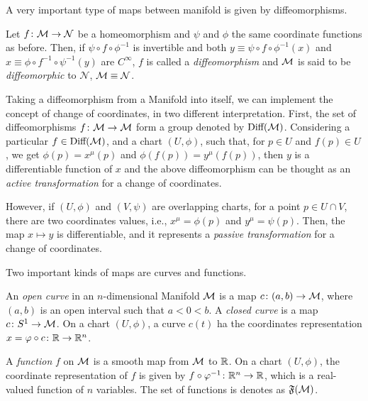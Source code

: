 A very important type of maps between manifold is given by diffeomorphisms.
\begin{definition}[Diffeomorphism]
    Let $f \colon \mathcal{M} \to \mathcal{N}$ be a homeomorphism and $\psi$ and $\phi$ the same coordinate functions as before. Then, if $\psi \circ f \circ \phi^{-1}$ is invertible and both $y \equiv \psi \circ f \circ \phi^{-1}(x)$ and $x \equiv \phi \circ f^{-1} \circ \psi^{-1}(y)$ are $C^\infty$, $f$ is called a \emph{diffeomorphism} and $\mathcal{M}$ is said to be \emph{diffeomorphic} to $\mathcal{N}$, $\mathcal{M} \equiv \mathcal{N}$.
\end{definition}

Taking a diffeomorphism from a Manifold into itself, we can implement the concept of change of coordinates, in two different interpretation. First, the set of diffeomorphisms $f\colon \mathcal{M} \to \mathcal{M}$ form a group denoted by $\textup{Diff}(\mathcal{M})$. Considering a particular $f \in \textup{Diff}(\mathcal{M})$, and a chart $(U, \phi)$, such that, for $p \in U$ and $f(p) \in U$, we get $\phi(p) = x^\mu(p)$ and $\phi(f(p))=y^\mu(f(p))$, then $y$ is a differentiable function of $x$ and the above diffeomorphism can be thought as an \emph{active transformation} for a change of coordinates.

However, if $(U,\phi)$ and $(V,\psi)$ are overlapping charts, for a point $p \in U \cap V$, there are two coordinates values, i.e., $x^\mu = \phi(p)$ and $y^\mu = \psi(p)$. Then, the map $x \mapsto y$ is differentiable, and it represents a \emph{passive transformation} for a change of coordinates.

Two important kinds of maps are curves and functions.

\begin{definition}[Curve]
    An \emph{open curve} in an $n$-dimensional Manifold $\mathcal{M}$ is a map $c \colon (a,b) \to \mathcal{M}$, where $(a,b)$ is an open interval such that $a<0<b$. A \emph{closed curve} is a map $c \colon S^1 \to \mathcal{M}$. On a chart $(U,\phi)$, a curve $c(t)$ ha the coordinates representation $x=\varphi \circ c \colon \mathbb{R} \to \mathbb{R}^n$.
\end{definition}

\begin{definition}[Function]
    A \emph{function} $f$ on $\mathcal{M}$ is a smooth map from $\mathcal{M}$ to $\mathbb{R}$. On a chart $(U,\phi)$, the coordinate representation of $f$ is given by $f \circ \varphi^{-1} \colon \mathbb{R}^n \to \mathbb{R}$, which is a real-valued function of $n$ variables. The set of functions is denotes as $\mathfrak{F}(\mathcal{M})$.
\end{definition}

